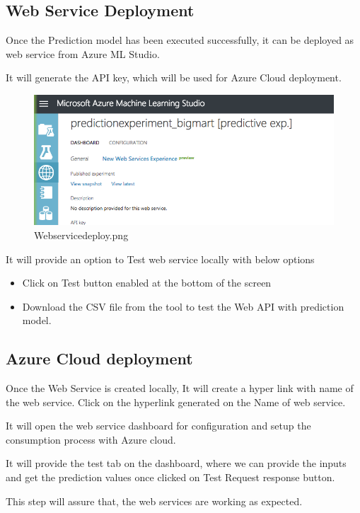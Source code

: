 \subsection{Web Service Deployment}
Once the Prediction model has been executed successfully, it can be deployed 
as web service from Azure ML Studio.

It will generate the API key, which will be used for Azure Cloud deployment.

\begin{figure}[pic6]
	\centering\includegraphics[width=\columnwidth]
{Images/mlstudio/Webservicedeploy.png}
	\caption{Webservicedeploy.png}
\label{fig:Webservicedeploy}
\end{figure}

It will provide an option to Test web service locally with below options
\begin{itemize}
\item Click on Test button enabled at the bottom of the screen
\item Download the CSV file from the tool to test the Web API 
with prediction model.
\end{itemize}

\subsection{Azure Cloud deployment}
Once the Web Service is created locally, It will create a hyper link with 
name of the web service. 
Click on the hyperlink generated on the Name of web service.

It will open the web service dashboard for configuration and setup the 
consumption process with Azure cloud.

It will provide the test tab on the dashboard, where we can provide the 
inputs and get the prediction values once clicked on Test Request response 
button.

This step will assure that, the web services are working as expected.

